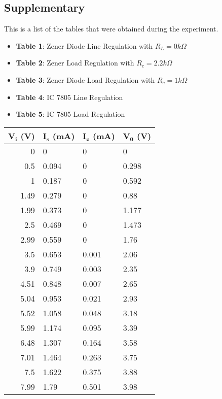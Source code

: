 \documentclass{scrartcl}
\newcommand{\1}{\mathbbm{1}}
\begin{document}
\begin{itemize}
\section{Supplementary}
This is a list of the tables that were obtained during the experiment.
\begin{itemize}
	\item \textbf{Table 1}: Zener Diode Line Regulation with $R_L = 0 k\Omega$
	\item \textbf{Table 2}: Zener Load Regulation with $R_c = 2.2 k\Omega$
	\item \textbf{Table 3}: Zener Diode Load Regulation with $R_c = 1 k\Omega$
	\item \textbf{Table 4}: IC 7805 Line Regulation
	\item \textbf{Table 5}: IC 7805 Load Regulation
\end{itemize}
\begin{table}[!ht]
    \centering
    \begin{tabular}{|r|l|l|l|}
    \hline
         \textbf{$\pmb{V_i}$ (V)} & \textbf{$\pmb{I_s}$ (mA)} & \textbf{$\pmb{I_z}$ (mA)} 
		& \textbf{$\pmb{V_0}$ (V)} \\ \hline
         0 & 0 & 0 & 0 \\ \hline
         0.5 & 0.094 & 0 & 0.298 \\ \hline
         1 & 0.187 & 0 & 0.592 \\ \hline
         1.49 & 0.279 & 0 & 0.88 \\ \hline
         1.99 & 0.373 & 0 & 1.177 \\ \hline
         2.5 & 0.469 & 0 & 1.473 \\ \hline
         2.99 & 0.559 & 0 & 1.76 \\ \hline
         3.5 & 0.653 & 0.001 & 2.06 \\ \hline
         3.9 & 0.749 & 0.003 & 2.35 \\ \hline
         4.51 & 0.848 & 0.007 & 2.65 \\ \hline
         5.04 & 0.953 & 0.021 & 2.93 \\ \hline
         5.52 & 1.058 & 0.048 & 3.18 \\ \hline
         5.99 & 1.174 & 0.095 & 3.39 \\ \hline
         6.48 & 1.307 & 0.164 & 3.58 \\ \hline
         7.01 & 1.464 & 0.263 & 3.75 \\ \hline
         7.5 & 1.622 & 0.375 & 3.88 \\ \hline
         7.99 & 1.79 & 0.501 & 3.98 \\ \hline

\end{tabular}
\end{table}
\end{itemize}
\end{document}
